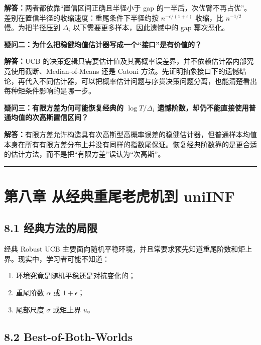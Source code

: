 \documentclass[
  11pt,
  a4paper,
]{ctexart}
\providecommand{\tightlist}{%
  \setlength{\itemsep}{0pt}\setlength{\parskip}{0pt}}
\begin{document}
\textbf{解答：}两者都依靠“置信区间正确且半径小于 gap 的一半后，次优臂不再占优”。差别在置信半径的收缩速度：重尾条件下半径约按 \(n^{-\epsilon/(1+\epsilon)}\) 收缩，比 \(n^{-1/2}\) 慢。为把半径压到 \(\Delta_i\) 以下需要更多样本，因此遗憾中的 gap 幂次恶化。

\textbf{疑问二：为什么把稳健均值估计器写成一个“接口”是有价值的？}

\textbf{解答：}UCB 的决策逻辑只需要估计值及其高概率误差界，并不依赖估计器内部究竟使用截断、Median-of-Means 还是 Catoni 方法。先证明抽象接口下的遗憾结论，再代入不同估计器，可以把概率估计问题与序贯决策问题分离，也能清楚看出每种矩条件影响的是哪一步。

\textbf{疑问三：有限方差为何可能恢复经典的 \(\log T/\Delta_i\) 遗憾阶数，却仍不能直接使用普通均值的次高斯置信区间？}

\textbf{解答：}有限方差允许构造具有次高斯型高概率误差的稳健估计器，但普通样本均值本身在所有有限方差分布上并没有同样的指数尾保证。恢复经典阶数靠的是更合适的估计方法，而不是把“有限方差”误认为“次高斯”。

\begin{center}\rule{0.5\linewidth}{0.5pt}\end{center}

\section{第八章 从经典重尾老虎机到
uniINF}\label{ux7b2cux516bux7ae0-ux4eceux7ecfux5178ux91cdux5c3eux8001ux864eux673aux5230-uniinf}

\subsection{8.1
经典方法的局限}\label{ux7ecfux5178ux65b9ux6cd5ux7684ux5c40ux9650}

经典 Robust UCB
主要面向随机平稳环境，并且常要求预先知道重尾阶数和矩上界。现实中，学习者可能不知道：

\begin{enumerate}
\def\labelenumi{\arabic{enumi}.}
\tightlist
\item
  环境究竟是随机平稳还是对抗变化的；
\item
  重尾阶数 \(\alpha\) 或 \(1+\epsilon\)；
\item
  尾部尺度 \(\sigma\) 或矩上界 \(u\)。
\end{enumerate}

\subsection{8.2 Best-of-Both-Worlds}\label{best-of-both-worlds}
\end{document}
